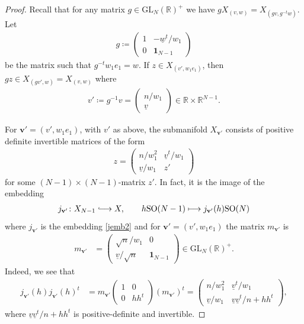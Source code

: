 \documentclass[10pt,a4paper]{amsart}
\newcommand{\GL}{\mathrm{GL}}
\newcommand{\R}{\mathbb{R}}
\newcommand{\SO}{\mathrm{SO}}
\newcommand{\hooklongrightarrow}{\lhook\joinrel\longrightarrow}
\newcommand{\id}{\mathbf{1}}
\newcommand{\vbf}{\mathbf{v}}
\newcommand{\vud}{\underline{v}}
\newcommand{\wud}{\underline{w}}
\begin{document}
\begin{proof} Recall that for any matrix $g \in \GL_N(\R)^+$ we have $gX_{(v,w)}=X_{(gv,g^{-t}w)}$. Let
\begin{align}
    g \coloneqq  \begin{pmatrix}
    1 & -\wud^t/w_1 \\
     0 & \id_{N-1}
    \end{pmatrix}
\end{align}
be the matrix such that $g^{-t}w_1e_1=w$. If $z \in X_{(v',w_1e_1)}$, then $gz \in X_{(gv',w)}=X_{(v,w)}$ where 
\begin{align}
v' \coloneqq g^{-1}v= \begin{pmatrix} n/w_1\\ \vud\end{pmatrix} \in \R \times \R^{N-1}.
\end{align}

For $\vbf'=(v',w_1e_1)$, with $v'$ as above, the submanifold $X_{\vbf'}$ consists of positive definite invertible matrices of the form
\begin{align}
    z= \begin{pmatrix}
        n/w_1^2 & \vud^t/w_1 \\
        \vud/w_1 & z'
    \end{pmatrix}
\end{align}
for some $(N-1) \times (N-1)$-matrix $z'$. In fact, it is the image of the embedding
\begin{align}
    j_{\vbf'} \colon X_{N-1} \hooklongrightarrow X, \qquad h\SO(N-1) \longmapsto j_{\vbf'}(h)\SO(N)
\end{align}
where $j_{\vbf'}$ is the embedding \eqref{jemb2} and for $\vbf'=(v',w_1e_1)$ the matrix $m_{\vbf'}$ is
\begin{align}
    m_{\vbf'} & = \begin{pmatrix}
        \sqrt{n}/w_1 & 0 \\
        \vud/\sqrt{n} & \id_{N-1}
    \end{pmatrix} \in \GL_N(\R)^+.
\end{align}
Indeed, we see that
\begin{align}
 j_{\vbf'}(h)j_{\vbf'}(h)^t & =   m_{\vbf'} \begin{pmatrix}
     1 & 0 \\ 0 & hh^t
 \end{pmatrix} (m_{\vbf'})^t = \begin{pmatrix}
     n/w_1^2 & \vud^t/w_1 \\ \vud/w_1 & \vud \vud^t/n+hh^t
 \end{pmatrix},
\end{align}
where $ \vud \vud^t/n+hh^t$ is positive-definite and invertible.


\end{proof}
\end{document}
